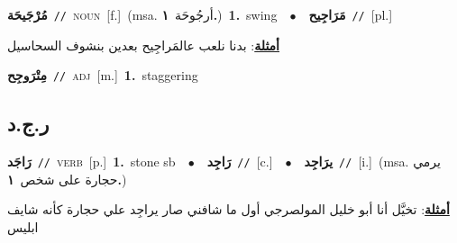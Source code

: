 \documentclass[10pt,a4paper,twoside]{article} %
\begin{document}
\begin{multicols}{2}
{\setlength\topsep{0pt}\textbf{\foreignlanguage{arabic}{مُرْجَيحَة}}\ {\color{gray}\texttt{//}\color{black}}\ \textsc{noun}\ [f.]\ \color{gray}(msa. \foreignlanguage{arabic}{أرجُوحَة}~\foreignlanguage{arabic}{\textbf{١.}})\color{black}\ \textbf{1.}~swing\ \ $\bullet$\ \ \setlength\topsep{0pt}\textbf{\foreignlanguage{arabic}{مَرَاجِيح}}\ {\color{gray}\texttt{//}\color{black}}\ [pl.]\  \begin{flushright}\color{gray}\foreignlanguage{arabic}{\textbf{\underline{\foreignlanguage{arabic}{أمثلة}}}: بدنا نلعب عالمَراجِيح بعدين بنشوف السحاسيل}\end{flushright}\color{black}} \vspace{2mm}

{\setlength\topsep{0pt}\textbf{\foreignlanguage{arabic}{مِتْرَوجِح}}\ {\color{gray}\texttt{//}\color{black}}\ \textsc{adj}\ [m.]\ \textbf{1.}~staggering\ } \vspace{2mm}

\vspace{-3mm}
\subsection*{\color{blue}\foreignlanguage{arabic}{ر.ج.د}\color{blue}{}} 

{\setlength\topsep{0pt}\textbf{\foreignlanguage{arabic}{رَاجَد}}\ {\color{gray}\texttt{//}\color{black}}\ \textsc{verb}\ [p.]\ \textbf{1.}~stone sb\ \ $\bullet$\ \ \setlength\topsep{0pt}\textbf{\foreignlanguage{arabic}{رَاجِد}}\ {\color{gray}\texttt{//}\color{black}}\ [c.]\ \ $\bullet$\ \ \setlength\topsep{0pt}\textbf{\foreignlanguage{arabic}{يرَاجِد}}\ {\color{gray}\texttt{//}\color{black}}\ [i.]\ \color{gray}(msa. \foreignlanguage{arabic}{يرمي حجارة على شخص}~\foreignlanguage{arabic}{\textbf{١.}})\color{black}\  \begin{flushright}\color{gray}\foreignlanguage{arabic}{\textbf{\underline{\foreignlanguage{arabic}{أمثلة}}}: تخيَّل أنا أبو خليل المولصرجي أول ما شافني صار يراجِد علي حجارة كأنه شايف ابليس}\end{flushright}\color{black}} \vspace{2mm}


\end{multicols}
\end{document}

